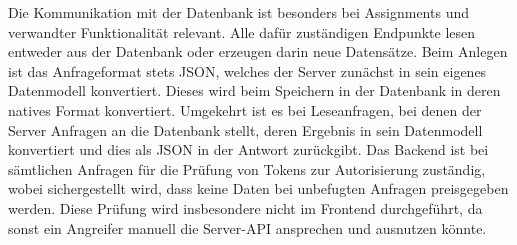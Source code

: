 Die Kommunikation mit der Datenbank ist besonders bei Assignments und verwandter Funktionalität relevant.
Alle dafür zuständigen Endpunkte lesen entweder aus der Datenbank oder erzeugen darin neue Datensätze.
Beim Anlegen ist das Anfrageformat stets JSON, welches der Server zunächst in sein eigenes Datenmodell konvertiert.
Dieses wird beim Speichern in der Datenbank in deren natives Format konvertiert.
Umgekehrt ist es bei Leseanfragen, bei denen der Server Anfragen an die Datenbank stellt, deren Ergebnis in sein Datenmodell konvertiert und dies als JSON in der Antwort zurückgibt.
Das Backend ist bei sämtlichen Anfragen für die Prüfung von Tokens zur Autorisierung zuständig, wobei sichergestellt wird, dass keine Daten bei unbefugten Anfragen preisgegeben werden.
Diese Prüfung wird insbesondere nicht im Frontend durchgeführt, da sonst ein Angreifer manuell die Server-API ansprechen und ausnutzen könnte.
